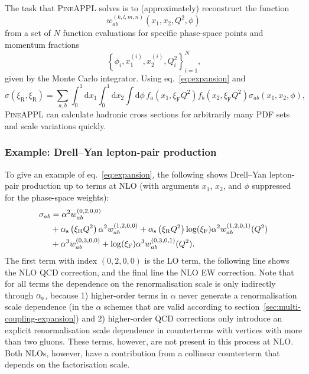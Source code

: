 The task that \textsc{PineAPPL} solves is to (approximately) reconstruct the function
\begin{equation}
w_{ab}^{(k,l,m,n)} \left( x_1, x_2, Q^2, \phi \right)
\end{equation}
from a set of $N$ function evaluations for specific phase-space points and momentum fractions
\begin{equation}
\left\{ \phi_i, x_1^{(i)}, x_2^{(i)}, Q^2_i \right\}_{i=1}^N \text{,}
\end{equation}
given by the Monte Carlo integrator.
Using eq.~\eqref{eq:expansion} and
\begin{equation}
\sigma (\xi_\mathrm{R}, \xi_\mathrm{R}) = \sum_{a,b} \int_0^1 \mathrm{d} x_1 \int_0^1 \mathrm{d} x_2 \int \mathrm{d} \phi \, f_a (x_1, \xi_\mathrm{F} Q^2) f_b (x_2, \xi_\mathrm{F} Q^2) \sigma_{ab} (x_1, x_2, \phi) \text{,}
\label{eq:pineappl-convolution}
\end{equation}
\textsc{PineAPPL} can calculate hadronic cross sections for arbitrarily many PDF sets and scale variations quickly.

\subsubsection{Example: Drell--Yan lepton-pair production}
\label{sec:pineappl-example}

To give an example of eq.~\eqref{eq:expansion}, the following shows Drell--Yan lepton-pair production up to terms at NLO (with arguments $x_1$, $x_2$, and $\phi$ suppressed for the phase-space weights):
\begin{equation}
\begin{split}
\sigma_{ab}
    &= \alpha^2 w_{ab}^{(0,2,0,0)} \\
    &+ \alpha_\mathrm{s} \left( \xi_\mathrm{R} Q^2 \right) \alpha^2 w_{ab}^{(1,2,0,0)} + \alpha_\mathrm{s} \left( \xi_\mathrm{R} Q^2 \right) \log (\xi_\mathrm{F}) \alpha^2 w_{ab}^{(1,2,0,1)} (Q^2) \\
    &+ \alpha^3 w_{ab}^{(0,3,0,0)} + \log (\xi_\mathrm{F}) \alpha^3 w_{ab}^{(0,3,0,1)} (Q^2) \text{.}
\end{split}
\end{equation}
The first term with index $(0,2,0,0)$ is the LO term, the following line shows the NLO QCD correction, and the final line the NLO EW correction.
Note that for all terms the dependence on the renormalisation scale is only indirectly through $\alpha_\mathrm{s}$, because 1) higher-order terms in $\alpha$ never generate a renormalisation scale dependence (in the $\alpha$ schemes that are valid according to section~\ref{sec:multi-coupling-expansion}) and 2) higher-order QCD corrections only introduce an explicit renormalisation scale dependence in counterterms with vertices with more than two gluons.
These terms, however, are not present in this process at NLO.
Both NLOs, however, have a contribution from a collinear counterterm that depends on the factorisation scale.

